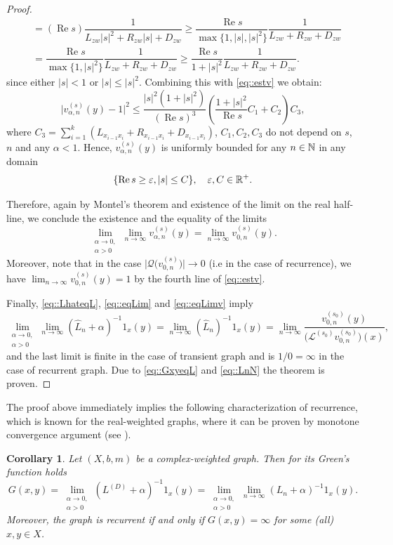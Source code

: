 \documentclass[a4paper,11pt]{amsart}
\newtheorem{corollary}[theorem]{Corollary}
\theoremstyle{definition}
\renewcommand{\Re}{\operatorname{Re}}%
\renewcommand{\L}{\mathcal{L}}
\newcommand{\Q}{\mathcal{Q}}
\newcommand{\cfreq}{s}
\begin{document}
\begin{proof}
\begin{align*}
&=(\Re s) \dfrac{1}{L_{zw}|s|^2+R_{zw}|s|+D_{zw}}\ge \dfrac{\Re s}{\max \{1,|s|,|s|^2\}} \dfrac{1}{L_{zw}+R_{zw}+D_{zw}}\\
&=\dfrac{\Re s}{\max\{ 1,|s|^2\}} \dfrac{1}{L_{zw}+R_{zw}+D_{zw}}\ge \dfrac{\Re s}{ 1+|s|^2} \dfrac{1}{L_{zw}+R_{zw}+D_{zw}}.
\end{align*}
since either $|s|<1$ or $|s|\le|s|^2$.
Combining this with \eqref {eq::estv} we obtain:
$$
\big|v_{\alpha,n}^{(\cfreq)}(y)-1\big|^2\le \dfrac{|s|^2(1+|s|^2)}{(\Re s)^3} \left(\frac{1 + |\cfreq|^2}{\Re \cfreq}C_1+C_2\right)C_3,
$$
where $C_3= \sum_{i=1}^{k}(L_{x_{i-1}x_i}+R_{x_{i-1}x_i}+D_{x_{i-1}x_i})$, $C_1,C_2,C_3$ do not depend on $s$, $n$ and any $\alpha<1$. Hence,  $v_{\alpha,n}^{(\cfreq)}(y)$ is uniformly bounded for any $n\in \Bbb N$  in any domain
$$
\{\Re \cfreq\ge\varepsilon, |\cfreq|\le C\}, \quad\varepsilon,  C\in \Bbb R^+.
$$


Therefore, again by Montel's theorem and existence of the limit on the real half-line, we conclude 
the existence and the equality of the limits
\begin{equation}\label{eq::eqLimv} 
\lim_{\substack{\alpha\to 0,\\\alpha>0}}\lim_{n\to\infty}v_{\alpha,n}^{(\cfreq)}(y)=\lim_{n\to\infty} v_{0,n}^{(\cfreq)}(y).
\end{equation}
Moreover, note that in the case $\Big|\Q\big(v^{(s)}_{0,n}\big)\Big|\to 0$ (i.e in the case of recurrence), we have $\lim_{n\to\infty} v_{0,n}^{(\cfreq)}(y)=1$ by the fourth line of \eqref{eq::estv}.

Finally,  \eqref{eq::LhateqL}, \eqref{eq::eqLim} and \eqref{eq::eqLimv} imply
$$
\lim_{\substack{\alpha\to 0,\\\alpha>0}}\lim_{n\to\infty}({\widehat L_n}+\alpha)^{-1}1_x(y)= \lim_{n\to\infty}({\widehat L_n})^{-1}1_x(y)=\lim_{n\to\infty}\dfrac{v_{0,n}^{(\cfreq_0)}(y)}{\big(\L^{(\cfreq_0)}   v_{0,n}^{(\cfreq_0)}\big)(x)},
$$
and the last limit is finite in the case of transient graph  and is $1/0=\infty$ in the case of recurrent graph. Due to \eqref{eq::GxyeqL} and \eqref{eq::LnN} the theorem is proven.
\end{proof}

The proof above immediately implies the following characterization of recurrence, which is known for the real-weighted graphs, where it can be proven by monotone convergence argument (see \cite[Chapter 6.4]{KellerLenzWojcBook}).
\begin{corollary}\label{cor::Greenrec}
Let $(X,b,m)$ be a complex-weighted graph. Then for its Green's function holds
$$
G(x,y)=\lim_{\substack{\alpha\to 0,\\\alpha>0}}(L^{(D)}+\alpha)^{-1}1_x(y)=\lim_{\substack{\alpha\to 0,\\\alpha>0}}\lim_{n\to\infty}({L_n}+\alpha)^{-1}1_x(y).
$$
Moreover, the graph is recurrent if and only if $G(x,y)=\infty$ for some (all) $x,y\in X$.
\end{corollary}
\end{document}
